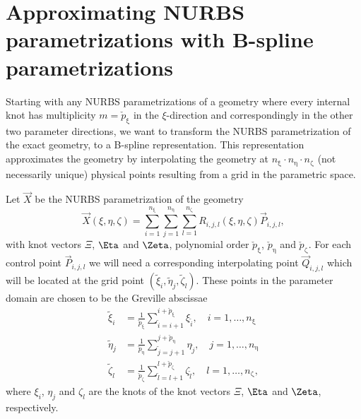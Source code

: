 \newpage
\section{Approximating NURBS parametrizations with B-spline parametrizations}
\label{Sec2:NURBStransformation}
Starting with any NURBS parametrizations of a geometry where every internal knot has multiplicity $m=\check{p}_\upxi$ in the $\xi$-direction and correspondingly in the other two parameter directions, we want to transform the NURBS parametrization of the exact geometry, to a B-spline representation. This representation approximates the geometry by interpolating the geometry at $n_\upxi\cdot n_\upeta\cdot n_\upzeta$ (not necessarily unique) physical points resulting from a grid in the parametric space.

Let $\vec{X}$ be the NURBS parametrization of the geometry
\begin{equation}
	\vec{X}(\xi,\eta,\zeta) = \sum_{i=1}^{n_\upxi}\sum_{j=1}^{n_\upeta}\sum_{l=1}^{n_\upzeta} R_{i,j,l}(\xi,\eta,\zeta)\vec{P}_{i,j,l},
\end{equation}
with knot vectors $\Xi$, $\Eta$ and $\Zeta$, polynomial order $\check{p}_\upxi$, $\check{p}_\upeta$ and $\check{p}_\upzeta$. For each control point $\vec{P}_{i,j,l}$ we will need a corresponding interpolating point $\vec{Q}_{i,j,l}$ which will be located at the grid point $\left(\tilde{\xi}_i,\tilde{\eta}_j,\tilde{\zeta}_l\right)$. These points in the parameter domain are chosen to be the Greville abscissae
\begin{align}
	\tilde{\xi}_i &= \frac{1}{\check{p}_\upxi}\sum_{\tilde{i} = i+1}^{i+\check{p}_\upxi} \xi_{\tilde{i}},\quad i = 1,\dots, n_\upxi\\
	\tilde{\eta}_j &= \frac{1}{\check{p}_\upeta}\sum_{\tilde{j} = j+1}^{j+\check{p}_\upeta} \eta_{\tilde{j}},\quad j = 1,\dots, n_\upeta\\
	\tilde{\zeta}_l &= \frac{1}{\check{p}_\upzeta}\sum_{\tilde{l} = l+1}^{l+\check{p}_\upzeta} \zeta_{\tilde{l}},\quad l = 1,\dots, n_\upzeta,
\end{align}
where $\xi_i$, $\eta_j$ and $\zeta_l$ are the knots of the knot vectors $\Xi$, $\Eta$ and $\Zeta$, respectively.

